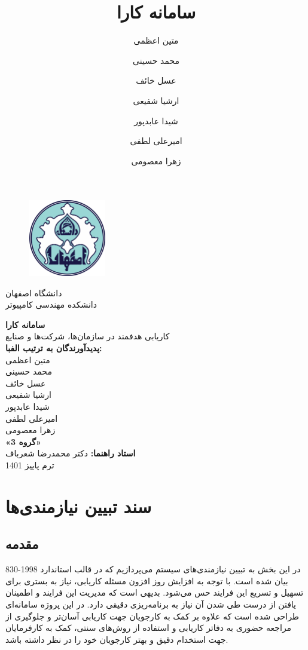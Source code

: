 \documentclass[12pt]{article}
\author{متین اعظمی}
\author{محمد حسینی}
\author{عسل خائف}
\author{ارشیا شفیعی}
\author{شیدا عابدپور}
\author{امیرعلی لطفی}
\author{زهرا معصومی}
\title{سامانه کارا}
\begin{document}
	\begin{figure}
		\centering
		\includegraphics[width=0.3\textwidth]{files/logo}
	\end{figure}
	\begin{center}
		دانشگاه اصفهان\\
		دانشکده مهندسی کامپیوتر
		\vspace{2\baselineskip}

		{\Huge \textbf{سامانه کارا}}\\

		\vspace{1\baselineskip}
		کاریابی هدفمند در سازمان‌ها، شرکت‌ها و صنایع\\

		\vspace{2\baselineskip}
		\textbf{پدیدآورندگان به ترتیب الفبا:}\\
		متین اعظمی\\
		محمد حسینی\\
		عسل خائف\\
		ارشیا شفیعی\\
		شیدا عابدپور\\
		امیرعلی لطفی\\
		زهرا معصومی\\
		\vspace{2\baselineskip}
		\textbf{«گروه 3»}\\
		\vspace{3\baselineskip}
		{\textbf{استاد راهنما:}}
		دکتر محمدرضا شعرباف\\
		\vspace{3\baselineskip}
		ترم پاییز 1401

	\end{center}

	\newpage
	\tableofcontents
	\newpage
	\listoftables
	\newpage
	\listoffigures
	\newpage

	\section{سند تبیین نیازمندی‌ها}

	\subsection{مقدمه}
	در این بخش به تبیین نیازمندی‌های سیستم می‌پردازیم که در قالب استاندارد 1998-830
	\textbf{}
	بیان شده است.
	با توجه به افزایش روز افزون مسئله کاریابی، نیاز به بستری برای تسهیل و تسریع این فرایند حس می‌شود. بدیهی است که مدیریت این فرایند و اطمینان یافتن از درست طی شدن آن نیاز به برنامه‌ریزی دقیقی دارد.
	در این پروژه سامانه‌ای طراحی شده است که علاوه بر کمک به کارجویان جهت کاریابی آسان‌تر و جلوگیری از مراجعه حضوری به دفاتر کاریابی و استفاده از روش‌های سنتی، کمک به کارفرمایان جهت استخدام دقیق و بهتر کارجویان خود را در نظر داشته باشد.
\end{document}
